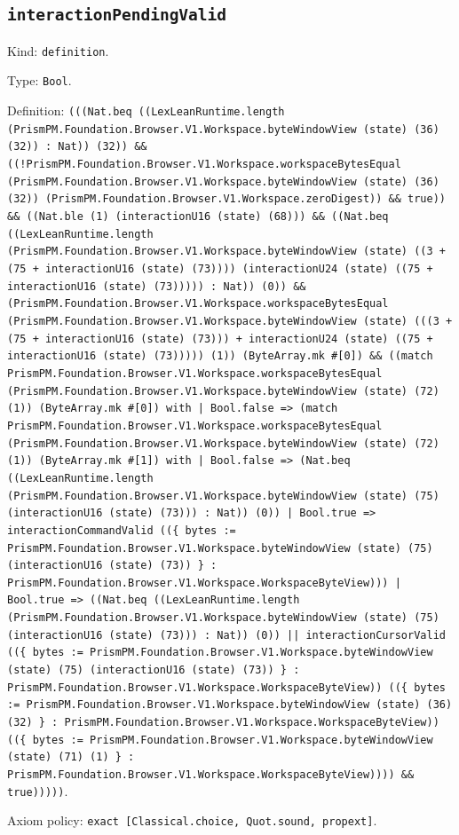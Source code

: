 \documentclass[11pt]{article}
\begin{document}
\subsection*{\texttt{interactionPendingValid}}
\noindent Kind: \texttt{definition}.\par
\noindent Type: \texttt{Bool}.\par
\noindent Definition: \texttt{(((Nat.beq ((LexLeanRuntime.length (PrismPM.Foundation.Browser.V1.Workspace.byteWindowView (state) (36) (32)) : Nat)) (32)) \&\& ((!PrismPM.Foundation.Browser.V1.Workspace.workspaceBytesEqual (PrismPM.Foundation.Browser.V1.Workspace.byteWindowView (state) (36) (32)) (PrismPM.Foundation.Browser.V1.Workspace.zeroDigest)) \&\& true)) \&\& ((Nat.ble (1) (interactionU16 (state) (68))) \&\& ((Nat.beq ((LexLeanRuntime.length (PrismPM.Foundation.Browser.V1.Workspace.byteWindowView (state) ((3 + (75 + interactionU16 (state) (73)))) (interactionU24 (state) ((75 + interactionU16 (state) (73))))) : Nat)) (0)) \&\& (PrismPM.Foundation.Browser.V1.Workspace.workspaceBytesEqual (PrismPM.Foundation.Browser.V1.Workspace.byteWindowView (state) (((3 + (75 + interactionU16 (state) (73))) + interactionU24 (state) ((75 + interactionU16 (state) (73))))) (1)) (ByteArray.mk \#[0]) \&\& ((match PrismPM.Foundation.Browser.V1.Workspace.workspaceBytesEqual (PrismPM.Foundation.Browser.V1.Workspace.byteWindowView (state) (72) (1)) (ByteArray.mk \#[0]) with | Bool.false => (match PrismPM.Foundation.Browser.V1.Workspace.workspaceBytesEqual (PrismPM.Foundation.Browser.V1.Workspace.byteWindowView (state) (72) (1)) (ByteArray.mk \#[1]) with | Bool.false => (Nat.beq ((LexLeanRuntime.length (PrismPM.Foundation.Browser.V1.Workspace.byteWindowView (state) (75) (interactionU16 (state) (73))) : Nat)) (0)) | Bool.true => interactionCommandValid ((\{ bytes := PrismPM.Foundation.Browser.V1.Workspace.byteWindowView (state) (75) (interactionU16 (state) (73)) \} : PrismPM.Foundation.Browser.V1.Workspace.WorkspaceByteView))) | Bool.true => ((Nat.beq ((LexLeanRuntime.length (PrismPM.Foundation.Browser.V1.Workspace.byteWindowView (state) (75) (interactionU16 (state) (73))) : Nat)) (0)) || interactionCursorValid ((\{ bytes := PrismPM.Foundation.Browser.V1.Workspace.byteWindowView (state) (75) (interactionU16 (state) (73)) \} : PrismPM.Foundation.Browser.V1.Workspace.WorkspaceByteView)) ((\{ bytes := PrismPM.Foundation.Browser.V1.Workspace.byteWindowView (state) (36) (32) \} : PrismPM.Foundation.Browser.V1.Workspace.WorkspaceByteView)) ((\{ bytes := PrismPM.Foundation.Browser.V1.Workspace.byteWindowView (state) (71) (1) \} : PrismPM.Foundation.Browser.V1.Workspace.WorkspaceByteView)))) \&\& true)))))}.\par
\noindent Axiom policy: \texttt{exact [Classical.choice, Quot.sound, propext]}.\par
\end{document}

